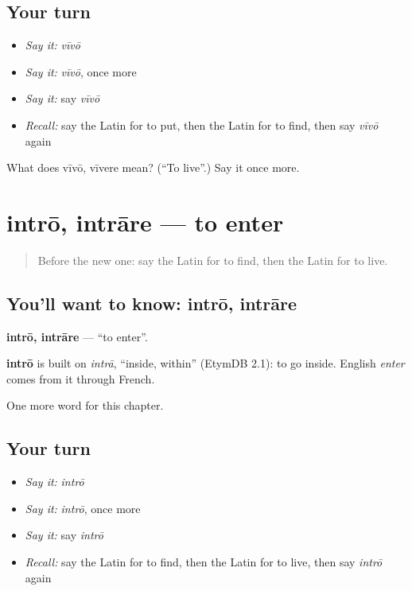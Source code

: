 \subsection*{Your turn}
\begin{itemize}
\raggedright
  \item \emph{Say it:} \emph{vīvō}
  \item \emph{Say it:} \emph{vīvō}, once more
  \item \emph{Say it:} say \emph{vīvō}
  \item \emph{Recall:} say the Latin for to put, then the Latin for to find, then say \emph{vīvō} again
\end{itemize}

\begin{tcolorbox}[breakable,colback=teal!4,colframe=teal!35!black,title={Before you move on}]
What does vīvō, vīvere mean? (\textquotedblleft{}To live\textquotedblright{}.) Say it once more.
\end{tcolorbox}
\section[intrō, intrāre]{intrō, intrāre — to enter}

\label{lesson:LA-C78-intro}



\begin{quote}
Before the new one: say the Latin for to find, then the Latin for to live.
\end{quote}

\subsection*{You'll want to know: intrō, intrāre}
\textbf{intrō, intrāre} — \textquotedblleft{}to enter\textquotedblright{}.

\begin{cousinweb}
\textbf{intrō} is built on \emph{intrā}, \textquotedblleft{}inside, within\textquotedblright{} (EtymDB 2.1): to go inside. English \emph{enter} comes from it through French.
\end{cousinweb}

\begin{grammarlens}[title={What you've built}]
One more word for this chapter.
\end{grammarlens}

\subsection*{Your turn}
\begin{itemize}
\raggedright
  \item \emph{Say it:} \emph{intrō}
  \item \emph{Say it:} \emph{intrō}, once more
  \item \emph{Say it:} say \emph{intrō}
  \item \emph{Recall:} say the Latin for to find, then the Latin for to live, then say \emph{intrō} again
\end{itemize}

